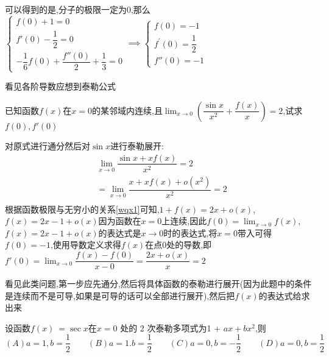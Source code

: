 \documentclass[8pt a4paper, oneside, UTF8]{ctexbook}
\begin{document}
\begin{sloppypar}
\begin{solution}
\begin{equation*}
    \end{equation*}    
    可以得到的是,分子的极限一定为0,那么$\begin{cases}f(0)+1=0\\f'(0)-\dfrac{1}{2}=0\\-\dfrac{1}{6}f(0)+\dfrac{f''(0)}{2}+\dfrac{1}{3}=0\end{cases}\implies \begin{cases}f(0)=-1\\f^{\prime}(0)=\dfrac{1}{2}\\f''(0)=-1\end{cases}$
    \end{solution}
    \begin{note}
        看见各阶导数应想到泰勒公式
    \end{note}
    \begin{problem}
        已知函数$f(x)$在$x=0$的某邻域内连续,且$\lim_{x \to 0}(\dfrac{\sin x}{x^2}+\dfrac{f(x)}{x})=2$,试求$f(0),f'(0)$
    \end{problem}
    \begin{solution}
        对原式进行通分然后对$\sin x$进行泰勒展开:
        \begin{equation*}
            \begin{split}    
                & \lim_{x \to 0}\dfrac{\sin x+xf(x)}{x^2}=2\\
                & = \lim_{x \to 0}\dfrac{x+xf(x)+o(x^2)}{x^2}=2 \\
            \end{split}
        \end{equation*} 
    根据函数极限与无穷小的关系\ref{wqx1}可知,$1+f(x)=2x+o(x)$,$f(x)=2x-1+o(x)$因为函数在$x=0$上连续,因此$f(0)=\lim_{x\to 0}f(x)$,$f(x)=2x-1+o(x)$的表达式是$x\to 0$时的表达式,将$x=0$带入可得$f(0)=-1$,使用导数定义求得$f(x)$在点0处的导数,即$f'(0)=\lim_{x \to 0}\dfrac{f(x)-f(0)}{x-0}=\dfrac{2x+o(x)}{x}=2$
    \end{solution}
    \begin{note}
        看见此类问题,第一步应先通分,然后将具体函数的泰勒进行展开(因为此题中的条件是连续而不是可导,如果是可导的话可以全部进行展开),然后把$f(x)$的表达式给求出来
    \end{note}
    \begin{problem}
        设函数$f(x)\:=\sec x$在$x=0$ 处的 2 次泰勒多项式为1 + $ax+bx^2$,则\\
        $(A)a=1,b=\dfrac{1}{2}  \qquad (B)a=1.b=\dfrac{1}{2}  \qquad (C)a=0,b=-\dfrac{1}{2} \qquad  (D)a=0,b=\dfrac{1}{2}$
    \end{problem}

\end{sloppypar}
\end{document}
